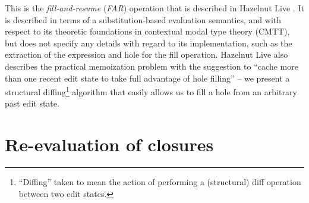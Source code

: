 This is the \textit{fill-and-resume} (\textit{FAR}) operation that is described in Hazelnut Live \cite{conf/popl/HazelnutLive19}. It is described in terms of a substitution-based evaluation semantics, and with respect to its theoretic foundations in contextual modal type theory (CMTT), but does not specify any details with regard to its implementation, such as the extraction of the expression and hole for the fill operation. Hazelnut Live also describes the practical memoization problem with the suggestion to ``cache more than one recent edit state to take full advantage of hole filling'' -- we present a structural diffing\footnote{``Diffing'' taken to mean the action of performing a (structural) diff operation between two edit states.} algorithm that easily allows us to fill a hole from an arbitrary past edit state.

\section{Re-evaluation of closures}
\label{sec:reeval-flag}





